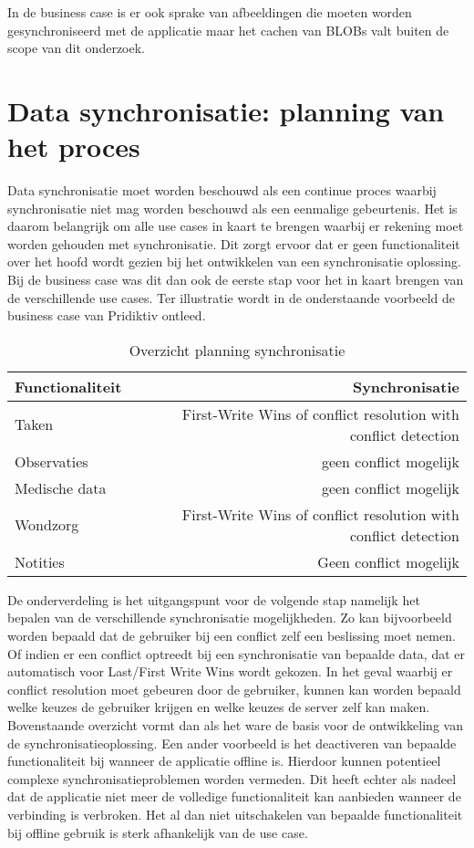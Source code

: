 In de business case is er ook sprake van afbeeldingen die moeten worden gesynchroniseerd met de applicatie maar het cachen van BLOBs valt buiten de scope van dit onderzoek.

\section{Data synchronisatie: planning van het proces}
Data synchronisatie moet worden beschouwd als een continue proces\autocite{data-integration-steps} waarbij synchronisatie niet mag worden beschouwd als een eenmalige gebeurtenis. Het is daarom belangrijk om alle use cases in kaart te brengen waarbij er rekening moet worden gehouden met synchronisatie. Dit zorgt ervoor dat er geen functionaliteit over het hoofd wordt gezien bij het ontwikkelen van een synchronisatie oplossing. 
\clearpage
Bij de business case was dit dan ook de eerste stap voor het in kaart brengen van de verschillende use cases. Ter illustratie wordt in de onderstaande voorbeeld de business case van Pridiktiv ontleed.

\begin{table}[htp]
\caption{Overzicht planning synchronisatie}
\begin{center}
\begin{tabular}{ l | r }
\hline
Functionaliteit & Synchronisatie \\ \hline
   Taken & First-Write Wins of conflict resolution with conflict detection \\
   Observaties & geen conflict mogelijk \\
   Medische data & geen conflict mogelijk \\
   Wondzorg & First-Write Wins of conflict resolution with conflict detection \\
   Notities & Geen conflict mogelijk \\
   \hline
\end{tabular}
\end{center}
\label{default}
\end{table}%

De onderverdeling is het uitgangspunt voor de volgende stap namelijk het bepalen van de verschillende synchronisatie mogelijkheden. Zo kan bijvoorbeeld worden bepaald dat de gebruiker bij een conflict zelf een beslissing moet nemen. Of indien er een conflict optreedt bij een synchronisatie van bepaalde data, dat er automatisch voor Last/First Write Wins wordt gekozen. In het geval waarbij er conflict resolution moet gebeuren door de gebruiker, kunnen kan worden bepaald welke keuzes de gebruiker krijgen en welke keuzes de server zelf kan maken. Bovenstaande overzicht vormt dan als het ware de basis voor de ontwikkeling van de synchronisatieoplossing. Een ander voorbeeld is het deactiveren van bepaalde functionaliteit bij wanneer de applicatie offline is. Hierdoor kunnen potentieel complexe synchronisatieproblemen worden vermeden. Dit heeft echter als nadeel dat de applicatie niet meer de volledige functionaliteit kan aanbieden wanneer de verbinding is verbroken. Het al dan niet uitschakelen van bepaalde functionaliteit bij offline gebruik is sterk afhankelijk van de use case.

